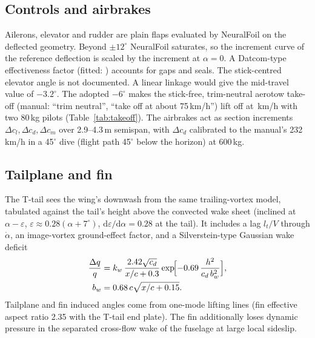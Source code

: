 \documentclass[10pt,a4paper,twocolumn]{article}
\begin{document}
\subsection{Controls and airbrakes}
Ailerons, elevator and rudder are plain flaps evaluated by NeuralFoil on the deflected geometry. Beyond $\pm12^\circ$
NeuralFoil saturates, so the increment curve of the reference deflection is scaled by the increment at $\alpha=0$. A Datcom-type
effectiveness factor (fitted: \NparFlap) accounts for gaps and seals. The stick-centred elevator angle is not documented. A linear
linkage would give the mid-travel value of $-3.2^\circ$. The adopted $-6^\circ$ makes the stick-free, trim-neutral aerotow take-off
(manual: ``trim neutral'', ``take off at about 75\,km/h'') lift off at \NloDualNine\,km/h with two 80\,kg pilots (Table~\ref{tab:takeoff}). The
airbrakes act as section increments $\Delta c_l,\Delta c_d,\Delta c_m$ over 2.9--4.3\,m semispan, with $\Delta c_d$ calibrated to the
manual's 232\,km/h in a 45$^\circ$ dive (flight path 45$^\circ$ below the horizon) at 600\,kg.

\subsection{Tailplane and fin}
The T-tail sees the wing's downwash from the same trailing-vortex model, tabulated against the tail's height above the
convected wake sheet (inclined at $\alpha-\varepsilon$, $\varepsilon\approx0.28(\alpha+7^\circ)$, $\mathrm d\varepsilon/\mathrm d\alpha=0.28$ at
the tail). It includes a lag $l_t/V$ through $\dot\alpha$, an image-vortex ground-effect factor, and a Silverstein-type Gaussian
wake deficit
\begin{equation}
\begin{aligned}
\frac{\Delta q}{q}&=k_w\,\frac{2.42\sqrt{c_d}}{x/c+0.3}\exp\!\Bigl[-0.69\,\frac{h^2}{c_d\,b_w^2}\Bigr],\\
b_w&=0.68\,c\sqrt{x/c+0.15}.
\end{aligned}
\end{equation}
Tailplane and fin induced angles come from one-mode lifting lines (fin effective aspect ratio 2.35 with the T-tail end plate).
The fin additionally loses dynamic pressure in the separated cross-flow wake of the fuselage at large local sideslip.
\end{document}
